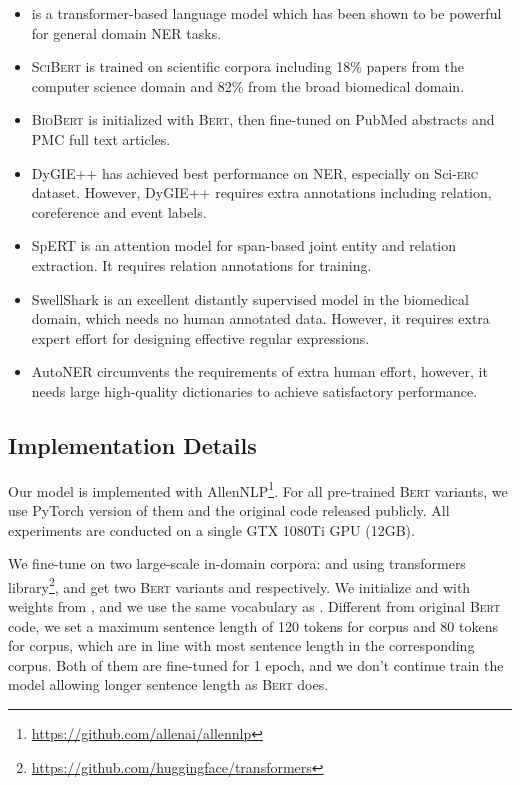 \documentclass[10pt, conference, compsocconf]{IEEEtran}
\newcommand{\bert}{\textsc{Bert}\xspace}
\newcommand{\scibert}{\textsc{SciBert}\xspace}
\newcommand{\biobert}{\textsc{BioBert}\xspace}
\newcommand{\Scierc}{\textsc{S}ci-\textsc{erc}\xspace}
\newcommand{\bio}{\xspace}
\newcommand{\cs}{\xspace}
\newcommand{\bertcs}{\xspace}
\newcommand{\bertbio}{\xspace}
\newcommand{\bertbase}{\xspace}
\begin{document}
\begin{itemize}
    \item \bertbase\cite{devlin2018bert} is a transformer-based language model
        which has been shown to be powerful for general domain NER tasks.

    \item \scibert\cite{beltagy-etal-2019-scibert} is trained on 
        scientific corpora including 18\% papers from the computer science domain
        and 82\% from the broad biomedical domain. 
\item \biobert\cite{lee2020biobert} is initialized with \bert, then fine-tuned on PubMed abstracts
        and PMC full text articles. 


        \item DyGIE++\cite{wadden-etal-2019-entity} has achieved 
        best performance on NER, especially on \Scierc dataset. However, DyGIE++ requires
        extra annotations including relation, coreference and event labels. 
        \item SpERT\cite{eberts2019span} is an attention model for span-based
        joint entity and relation extraction. It requires relation annotations for training.
\item SwellShark\cite{fries2017swellshark} is an excellent 
        distantly supervised model in the biomedical domain, which needs no human annotated data.
However, it requires extra expert effort for designing effective regular expressions.
\item AutoNER\cite{shang-etal-2018-learning} circumvents the requirements
    of extra human effort, however, it needs large high-quality dictionaries
    to achieve satisfactory performance.

\end{itemize}



\subsection{Implementation Details}
Our model is implemented with AllenNLP\footnote{\url{https://github.com/allenai/allennlp}}.
For all pre-trained \bert variants, we use PyTorch version of them and the 
original code released publicly. All experiments are conducted on a single 
GTX 1080Ti GPU (12GB). 

We fine-tune \bertbase on two large-scale in-domain corpora: \cs and \bio using transformers
library\footnote{\url{https://github.com/huggingface/transformers}}, and get 
two \bert variants \bertcs and \bertbio respectively.
We initialize \bertcs and \bertbio with weights from \bertbase, 
and we use the same vocabulary as \bertbase.
Different from original \bert code, we set a maximum sentence length 
of 120 tokens for \cs corpus and 80 tokens for \bio corpus, 
which are in line with most sentence length in the corresponding corpus.
Both of them are fine-tuned for 1 epoch, and we don't continue train the model 
allowing longer sentence length as \bert does.
\end{document}
